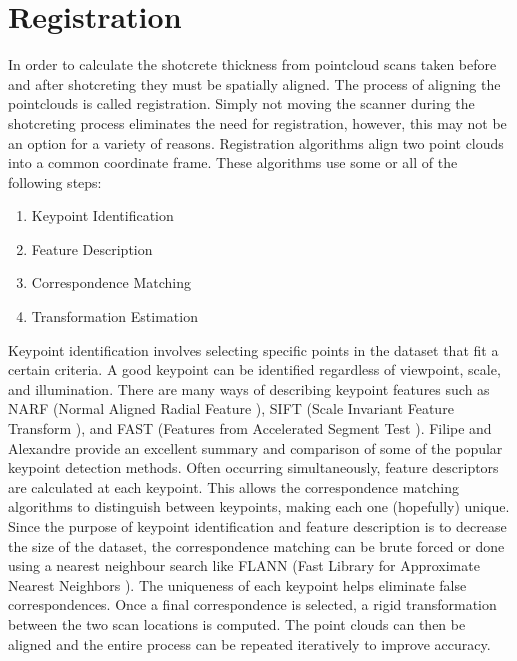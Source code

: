 \section{Registration}

In order to calculate the shotcrete thickness from pointcloud scans taken before and after shotcreting they must be spatially aligned. The process of aligning the pointclouds is called registration. Simply not moving the scanner during the shotcreting process eliminates the need for registration, however, this may not be an option for a variety of reasons. Registration algorithms align two point clouds into a common coordinate frame. These algorithms use some or all of the following steps: 

\begin{enumerate}
    \item Keypoint Identification
    \item Feature Description
    \item Correspondence Matching
    \item Transformation Estimation
\end{enumerate}

Keypoint identification involves selecting specific points in the dataset that fit a certain criteria. A good keypoint can be identified regardless of viewpoint, scale, and illumination. There are many ways of describing keypoint features such as NARF (Normal Aligned Radial Feature \cite{narf}), SIFT (Scale Invariant Feature Transform \cite{sift}), and FAST (Features from Accelerated Segment Test \cite{fast}). Filipe and Alexandre provide an excellent summary and comparison of some of the popular keypoint detection methods\cite{keypoint}. Often occurring simultaneously, feature descriptors are calculated at each keypoint. This allows the correspondence matching algorithms to distinguish between keypoints, making each one (hopefully) unique. Since the purpose of keypoint identification and feature description is to decrease the size of the dataset, the correspondence matching can be brute forced or done using a nearest neighbour search like FLANN (Fast Library for Approximate Nearest Neighbors \cite{flann}). The uniqueness of each keypoint helps eliminate false correspondences. Once a final correspondence is selected, a rigid transformation between the two scan locations is computed. The point clouds can then be aligned and the entire process can be repeated iteratively to improve accuracy.\\

